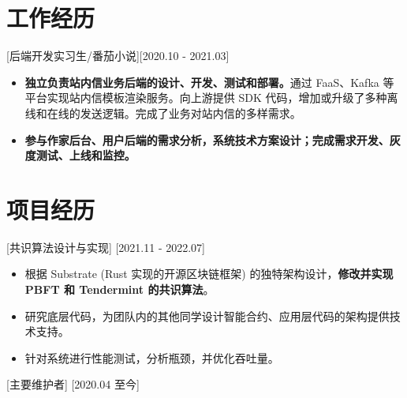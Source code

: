 \documentclass{resume}
\begin{document}
\section{工作经历}

[后端开发实习生/番茄小说][2020.10 - 2021.03] 
\begin{itemize}
  \item \textbf{独立负责站内信业务后端的设计、开发、测试和部署。}通过 FaaS、Kafka 等平台实现站内信模板渲染服务。向上游提供 SDK 代码，增加或升级了多种离线和在线的发送逻辑。完成了业务对站内信的多样需求。
  \item \textbf{参与作家后台、用户后端的需求分析，系统技术方案设计；完成需求开发、灰度测试、上线和监控。}
\end{itemize}


%
%
%
%

\section{项目经历}

[共识算法设计与实现]
[2021.11 - 2022.07] 

\begin{itemize}
  \item 根据 Substrate (Rust 实现的开源区块链框架) 的独特架构设计，\textbf{修改并实现 PBFT 和 Tendermint 的共识算法}。
  \item 研究底层代码，为团队内的其他同学设计智能合约、应用层代码的架构提供技术支持。
  \item 针对系统进行性能测试，分析瓶颈，并优化吞吐量。 
\end{itemize}

[主要维护者]
[2020.04 至今]
\end{document}
